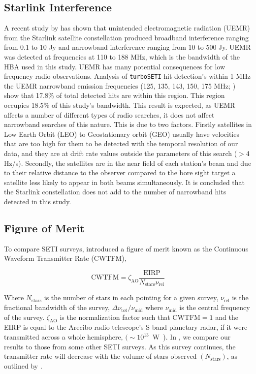 \subsection{Starlink Interference}
A recent study by \cite{LOFAR-Starlink} has shown that unintended electromagnetic radiation (UEMR) from the Starlink satellite constellation produced broadband interference ranging from 0.1 to 10 Jy and narrowband interference ranging from 10 to 500 Jy. UEMR was detected at frequencies at 110 to 188 MHz, which is the bandwidth of the HBA used in this study. UEMR has many potential consequences for low frequency radio observations. Analysis of \verb|turboSETI| hit detection's within 1 MHz the UEMR narrowband emission frequencies (125, 135, 143, 150, 175 MHz; \citealt{LOFAR-Starlink}) show that 17.8\% of total detected hits are within this region. This region occupies 18.5\% of this study's bandwidth. This result is expected, as UEMR affects a number of different types of radio searches, it does not affect narrowband searches of this nature. This is due to two factors. Firstly satellites in Low Earth Orbit (LEO) to Geostationary orbit (GEO) usually have velocities that are too high for them to be detected with the temporal resolution of our data, and they are at drift rate values outside the parameters of this search ($>$4 Hz/s). Secondly, the satellites are in the near field of each station's beam and due to their relative distance to the observer compared to the bore sight target a satellite less likely to appear in both beams simultaneously. It is concluded that the Starlink constellation does not add to the number of narrowband hits detected in this study.


\subsection{Figure of Merit}
To compare SETI surveys, \cite{Enriquez:2017} introduced a figure of merit known as the Continuous Waveform Transmitter Rate (CWTFM), 

\begin{equation}
    \text{CWTFM} = \zeta_{\text{AO}} \dfrac{\text{EIRP}}{N_{\text{stars}} \nu_{\text{rel}}}
    \label{eq:CWTFM}
\end{equation}

Where $N_{\text{stars}}$ is the number of stars in each pointing for a given survey, $\nu_{\text{rel}}$ is the fractional bandwidth of the survey, $\Delta \nu_{\text{tot}}/\nu_{\text{mid}}$ where $\nu_{\text{mid}}$ is the central frequency of the survey. $\zeta_{\text{AO}}$ is the normalization factor such that $\text{CWTFM} = 1$ and the EIRP is equal to the Arecibo radio telescope's S-band planetary radar, if it were transmitted across a whole hemisphere, $(\sim 10^{13}$~W~\citealt{Siemion_KEPLER_ApJ}). In , we compare our results to those from some other SETI surveys. As this survey continues, the transmitter rate will decrease with the volume of stars observed $(N_\text{stars})$, as outlined by .

